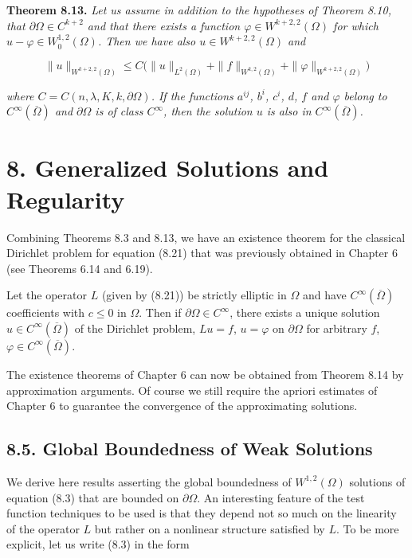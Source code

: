 \textbf{Theorem 8.13.} \emph{Let us assume in addition to the hypotheses of Theorem
8.10, that $\partial\Omega\in C^{k+2}$ and that there exists a function
$\varphi\in W^{k+2,2}(\Omega)$ for which $u-\varphi\in W_0^{1,2}(\Omega)$.
Then we have also $u\in W^{k+2,2}(\Omega)$ and}

\begin{equation}
\tag{8.27}
\|u\|_{W^{k+2,2}(\Omega)}\le C\bigl(\|u\|_{L^2(\Omega)}+\|f\|_{W^{k,2}(\Omega)}+\|\varphi\|_{W^{k+2,2}(\Omega)}\bigr)
\end{equation}

\emph{where $C=C(n,\lambda,K,k,\partial\Omega)$. If the functions $a^{ij}$, $b^i$,
$c^i$, $d$, $f$ and $\varphi$ belong to $C^\infty(\overline{\Omega})$ and
$\partial\Omega$ is of class $C^\infty$, then the solution $u$ is also in
$C^\infty(\overline{\Omega})$.}


\section*{8. Generalized Solutions and Regularity}

Combining Theorems 8.3 and 8.13, we have an existence theorem for the classical Dirichlet problem for equation (8.21) that was previously obtained in Chapter 6 (see Theorems 6.14 and 6.19).

\begin{theorem}[8.14]
Let the operator $L$ (given by (8.21)) be strictly elliptic in $\Omega$ and have $C^\infty(\overline{\Omega})$ coefficients with $c \le 0$ in $\Omega$. Then if $\partial \Omega \in C^\infty$, there exists a unique solution $u \in C^\infty(\overline{\Omega})$ of the Dirichlet problem, $Lu=f$, $u=\varphi$ on $\partial \Omega$ for arbitrary $f$, $\varphi \in C^\infty(\overline{\Omega})$.
\end{theorem}

The existence theorems of Chapter 6 can now be obtained from Theorem 8.14 by approximation arguments. Of course we still require the apriori estimates of Chapter 6 to guarantee the convergence of the approximating solutions.

\subsection*{8.5. Global Boundedness of Weak Solutions}

We derive here results asserting the global boundedness of $W^{1,2}(\Omega)$ solutions of equation (8.3) that are bounded on $\partial \Omega$. An interesting feature of the test function techniques to be used is that they depend not so much on the linearity of the operator $L$ but rather on a nonlinear structure satisfied by $L$. To be more explicit, let us write (8.3) in the form


